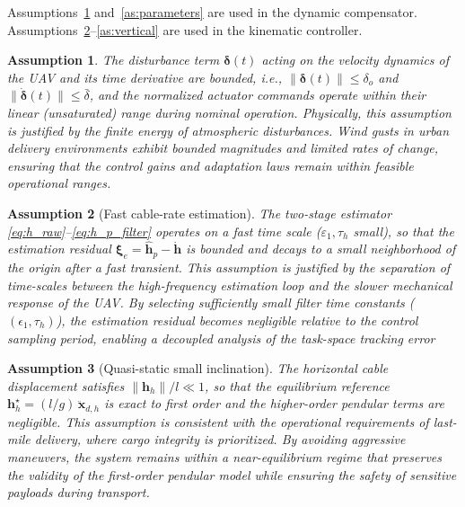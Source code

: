 \documentclass[sn-mathphys-num]{sn-jnl}
\newtheorem{assumption}{Assumption}
\theoremstyle{thmstyleone}%
\theoremstyle{thmstyletwo}%
\theoremstyle{thmstylethree}%
\begin{document}
Assumptions~\ref{as:physical} and~\ref{as:parameters} are used in the dynamic compensator. Assumptions~\ref{as:estimation}--\ref{as:vertical} are used in the kinematic controller.

\begin{assumption}\label{as:physical}
The disturbance term $\boldsymbol{\delta}(t)$ acting on the velocity dynamics of the UAV and its time derivative are bounded, i.e., $\|\boldsymbol{\delta}(t)\|\le\delta_o$ and $\|\dot{\boldsymbol{\delta}}(t)\|\le\bar{\delta}$, and the normalized actuator commands operate within their linear (unsaturated) range during nominal operation. Physically, this assumption is justified by the finite energy of atmospheric disturbances. Wind gusts in urban delivery environments exhibit bounded magnitudes and limited rates of change, ensuring that the control gains and adaptation laws remain within feasible operational ranges.
\end{assumption}

\begin{assumption}[Fast cable-rate estimation]\label{as:estimation}
The two-stage estimator \eqref{eq:h_raw}--\eqref{eq:h_p_filter} operates on a fast time scale ($\varepsilon_1,\tau_h$ small), so that the estimation residual
$\boldsymbol{\xi}_e=\hat{\mathbf{h}}_p-\dot{\mathbf{h}}$ is bounded and decays to a small neighborhood of the origin after a fast transient. This assumption is justified by the separation of time-scales between the high-frequency estimation loop and the slower mechanical response of the UAV. By selecting sufficiently small filter time constants ($(\epsilon_1, \tau_h)$), the estimation residual becomes negligible relative to the control sampling period, enabling a decoupled analysis of the task-space tracking error
\end{assumption}

\begin{assumption}[Quasi-static small inclination]\label{as:smallangle}
The horizontal cable displacement satisfies $\|\mathbf{h}_h\|/l\ll 1$, so that the
equilibrium reference $\mathbf{h}_h^\star=(l/g)\,\ddot{\mathbf{x}}_{d,h}$ is exact to first order and the higher-order pendular terms are negligible. This assumption is consistent with the operational requirements of last-mile delivery, where cargo integrity is prioritized. By avoiding aggressive maneuvers, the system remains within a near-equilibrium regime that preserves the validity of the first-order pendular model while ensuring the safety of sensitive payloads during transport.
\end{assumption}
\end{document}
